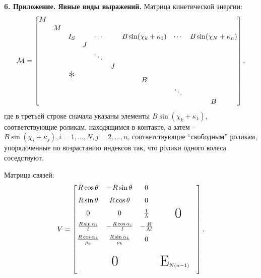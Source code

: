{\bf 6. Приложение. Явные виды выражений.}
Матрица кинетической энергии:
$$
\M = \begin{bmatrix}
    M &   &               &   &        &   &                        &        &                        \\
      & M &               &   &        &   &                        &        &                        \\
      &   & I_S           &   & \cdots &   & B\sin(\chi_k+\kappa_1) & \cdots & B\sin(\chi_N+\kappa_n) \\
      &   &               & J &        &   &                        &        &                        \\
      &   &               &   & \ddots &   &                        &        &                        \\
      &   &               &   &        & J &                        &        &                        \\
      &   & \text{\huge*} &   &        &   & B                      &        &                        \\
      &   &               &   &        &   &                        & \ddots &                        \\
      &   &               &   &        &   &                        &        & B                      \\
\end{bmatrix},
$$
где в третьей строке сначала указаны элементы $B\sin(\chi_k + \kappa_1)$, соответствующие роликам, находящимся в контакте, а затем -- $B\sin(\chi_i + \kappa_j), i = 1,\ldots,N, j = 2,\ldots,n$, соответствующие ``свободным'' роликам, упорядоченные по возрастанию индексов так, что ролики одного колеса соседствуют.

Матрица связей:
$$
V = \begin{bmatrix}
    \begin{matrix}
        R\cos\theta                  & -R\sin\theta                  & 0                    \\[6pt]
        R\sin\theta                  &  R\cos\theta                  & 0                    \\[6pt]
        0                            & 0                             & \frac{1}{\Lambda}    \\[6pt]
        \frac{R\sin\alpha_i}{l}      & -\frac{R\cos\alpha_i}{l}      & -\frac{R}{\Lambda l} \\[6pt]
        \frac{R\cos\alpha_k}{\rho_k} &  \frac{R\sin\alpha_k}{\rho_k} & 0                    \\[6pt]
    \end{matrix}   & \text{\huge 0}                \\[50pt]
    \text{\huge 0} & \text{\huge E}_{N(n-1)} \quad \\[10pt]
\end{bmatrix}.
$$

